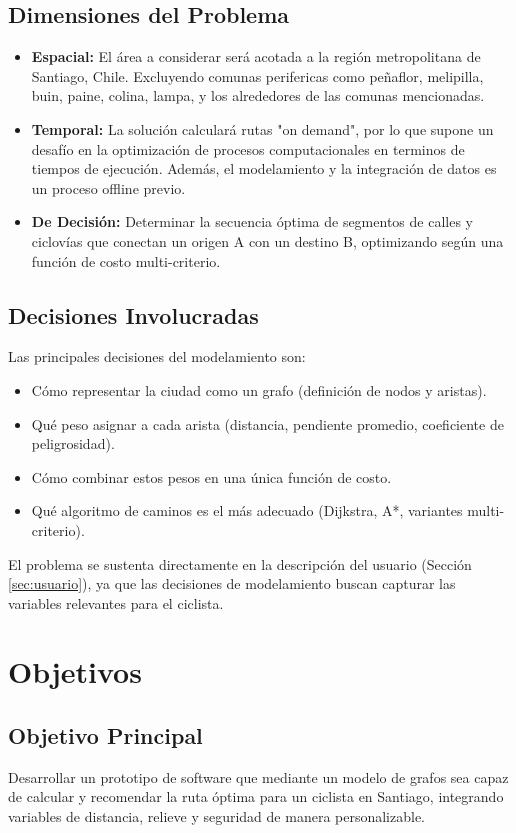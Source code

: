 \documentclass[12pt, a4paper, spanish]{article}
\begin{document}
\subsection{Dimensiones del Problema}
\begin{itemize}
    \item \textbf{Espacial:} El área a considerar será acotada a la región metropolitana de Santiago, Chile. Excluyendo comunas perifericas como peñaflor, melipilla, buin, paine, colina, lampa, y los alrededores de las comunas mencionadas.
    \item \textbf{Temporal:} La solución calculará rutas "on demand", por lo que supone un desafío en la optimización de procesos computacionales en terminos de tiempos de ejecución. Además, el modelamiento y la integración de datos es un proceso offline previo.
    \item \textbf{De Decisión:} Determinar la secuencia óptima de segmentos de calles y ciclovías que conectan un origen A con un destino B, optimizando según una función de costo multi-criterio.
\end{itemize}

\subsection{Decisiones Involucradas}
Las principales decisiones del modelamiento son:
\begin{itemize}
    \item Cómo representar la ciudad como un grafo (definición de nodos y aristas).
    \item Qué peso asignar a cada arista (distancia, pendiente promedio, coeficiente de peligrosidad).
    \item Cómo combinar estos pesos en una única función de costo.
    \item Qué algoritmo de caminos es el más adecuado (Dijkstra, A*, variantes multi-criterio).
\end{itemize}
El problema se sustenta directamente en la descripción del usuario (Sección \ref{sec:usuario}), ya que las decisiones de modelamiento buscan capturar las variables relevantes para el ciclista.

\section{Objetivos}
\label{sec:objetivos}

\subsection{Objetivo Principal}
Desarrollar un prototipo de software que mediante un modelo de grafos sea capaz de calcular y recomendar la ruta óptima para un ciclista en Santiago, integrando variables de distancia, relieve y seguridad de manera personalizable.
\end{document}
